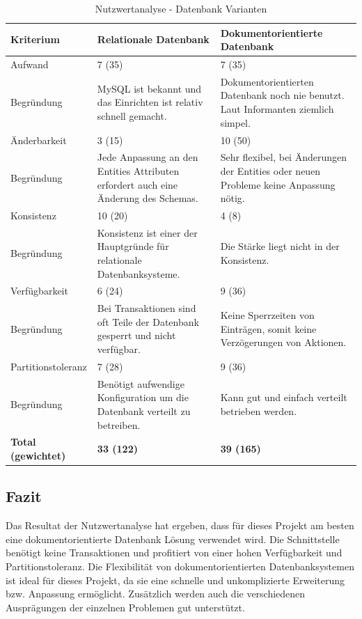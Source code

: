 \begin{table}[ht]
\centering
  \begin{tabular}{>{\columncolor{darkgray}} l | p{5cm} | p{5cm}}
	\hline
	\rowcolor{darkgray}
	\textbf{Kriterium}		&	\textbf{Relationale Datenbank} 	&	\textbf{Dokumentorientierte Datenbank}	\\ \hline
	\rowcolor{gray}
	Aufwand		&	7 (35)		&	7 (35)		\\ \hline
	Begründung		&	MySQL ist bekannt und das Einrichten ist relativ schnell gemacht.			
				&	Dokumentorientierten Datenbank noch nie benutzt. Laut Informanten ziemlich simpel.	\\ \hline
	\rowcolor{gray}
	Änderbarkeit		&	3 (15)		&	10 (50)		\\ \hline
	Begründung		&	Jede Anpassung an den Entities Attributen erfordert auch eine Änderung des Schemas.
				&	Sehr flexibel, bei Änderungen der Entities oder neuen Probleme keine Anpassung nötig.\\ \hline
	\rowcolor{gray}
	Konsistenz		&	10 (20)	&	4 (8)		\\ \hline
	Begründung		&	Konsistenz ist einer der Hauptgründe für relationale Datenbanksysteme.			
				&	Die Stärke liegt nicht in der Konsistenz.\\ \hline
	\rowcolor{gray}
	Verfügbarkeit	&	6 (24)	&	9 (36)		\\ \hline
	Begründung		&	Bei Transaktionen sind oft Teile der Datenbank gesperrt und nicht verfügbar.					
				&	Keine Sperrzeiten von Einträgen, somit keine Verzögerungen von Aktionen.	\\ \hline
	\rowcolor{gray}
	Partitionstoleranz	&	7 (28)	&	9 (36)		\\ \hline
	Begründung		&	Benötigt aufwendige Konfiguration um die Datenbank verteilt zu betreiben.
				&	Kann gut und einfach verteilt betrieben werden.		\\ \hline \hline
	\rowcolor{gray}
	\textbf{Total (gewichtet)}	&	\textbf{33 (122)}	&	\textbf{39 (165)}	\\ \hline
  \end{tabular}
   \caption{Nutzwertanalyse - Datenbank Varianten}\label{table:bewertungskriterien}
\end{table}

\FloatBarrier
\subsection{Fazit}\label{architektur_fazit}
Das Resultat der Nutzwertanalyse hat ergeben, dass für dieses Projekt am besten eine dokumentorientierte Datenbank Lösung verwendet wird.
Die Schnittstelle benötigt keine Transaktionen und profitiert von einer hohen Verfügbarkeit und Partitionstoleranz. Die Flexibilität
von dokumentorientierten Datenbanksystemen ist ideal für dieses Projekt, da sie eine schnelle und unkomplizierte Erweiterung bzw. Anpassung ermöglicht. Zusätzlich werden 
auch die verschiedenen Ausprägungen der einzelnen Problemen gut unterstützt.


